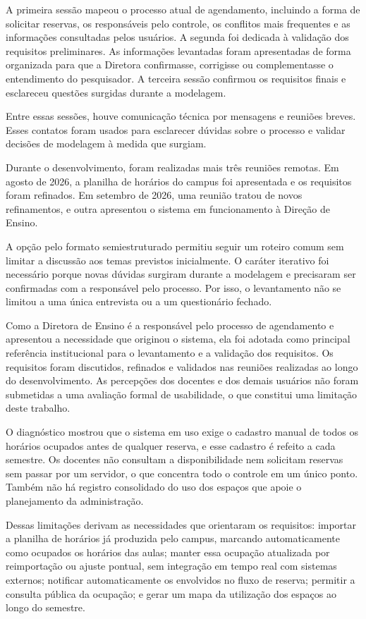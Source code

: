 \documentclass[
	12pt,				%
	twoside,			%
	openany,			%
	a4paper,			%
	chapter=TITLE,		%
	section=TITLE,		%
	subsection=TITLE,	%
	subsubsection=TITLE,%
	english,			%
	french,				%
	spanish,			%
	brazil,				%
	]{abntex2}
\begin{document}
A primeira sessão mapeou o processo atual de agendamento, incluindo a forma de solicitar reservas, os responsáveis pelo controle, os conflitos mais frequentes e as informações consultadas pelos usuários. A segunda foi dedicada à validação dos requisitos preliminares. As informações levantadas foram apresentadas de forma organizada para que a Diretora confirmasse, corrigisse ou complementasse o entendimento do pesquisador. A terceira sessão confirmou os requisitos finais e esclareceu questões surgidas durante a modelagem.

Entre essas sessões, houve comunicação técnica por mensagens e reuniões breves. Esses contatos foram usados para esclarecer dúvidas sobre o processo e validar decisões de modelagem à medida que surgiam.

Durante o desenvolvimento, foram realizadas mais três reuniões remotas. Em agosto de 2026, a planilha de horários do campus foi apresentada e os requisitos foram refinados. Em setembro de 2026, uma reunião tratou de novos refinamentos, e outra apresentou o sistema em funcionamento à Direção de Ensino.

A opção pelo formato semiestruturado permitiu seguir um roteiro comum sem limitar a discussão aos temas previstos inicialmente. O caráter iterativo foi necessário porque novas dúvidas surgiram durante a modelagem e precisaram ser confirmadas com a responsável pelo processo. Por isso, o levantamento não se limitou a uma única entrevista ou a um questionário fechado.

Como a Diretora de Ensino é a responsável pelo processo de agendamento e apresentou a necessidade que originou o sistema, ela foi adotada como principal referência institucional para o levantamento e a validação dos requisitos. Os requisitos foram discutidos, refinados e validados nas reuniões realizadas ao longo do desenvolvimento. As percepções dos docentes e dos demais usuários não foram submetidas a uma avaliação formal de usabilidade, o que constitui uma limitação deste trabalho.

O diagnóstico mostrou que o sistema em uso exige o cadastro manual de todos os horários ocupados antes de qualquer reserva, e esse cadastro é refeito a cada semestre. Os docentes não consultam a disponibilidade nem solicitam reservas sem passar por um servidor, o que concentra todo o controle em um único ponto. Também não há registro consolidado do uso dos espaços que apoie o planejamento da administração.

Dessas limitações derivam as necessidades que orientaram os requisitos: importar a planilha de horários já produzida pelo campus, marcando automaticamente como ocupados os horários das aulas; manter essa ocupação atualizada por reimportação ou ajuste pontual, sem integração em tempo real com sistemas externos; notificar automaticamente os envolvidos no fluxo de reserva; permitir a consulta pública da ocupação; e gerar um mapa da utilização dos espaços ao longo do semestre.
\end{document}

